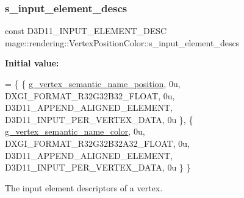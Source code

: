 \subsubsection{\texorpdfstring{s\+\_\+input\+\_\+element\+\_\+descs}{s\_input\_element\_descs}}
{\footnotesize\ttfamily const D3\+D11\+\_\+\+I\+N\+P\+U\+T\+\_\+\+E\+L\+E\+M\+E\+N\+T\+\_\+\+D\+E\+SC mage\+::rendering\+::\+Vertex\+Position\+Color\+::s\+\_\+input\+\_\+element\+\_\+descs\hspace{0.3cm}{\ttfamily [static]}}

{\bfseries Initial value\+:}
\begin{DoxyCode}
= \{
        \{ \hyperlink{namespacemage_1_1rendering_ae0a999915bd61d5a9d8addc04fe0646a}{g\_vertex\_semantic\_name\_position}, 0u, DXGI\_FORMAT\_R32G32B32\_FLOAT, 
         0u, D3D11\_APPEND\_ALIGNED\_ELEMENT, D3D11\_INPUT\_PER\_VERTEX\_DATA, 0u \},
        \{ \hyperlink{namespacemage_1_1rendering_a30c6185c03e23c5719a43ac9120d6f90}{g\_vertex\_semantic\_name\_color},    0u, DXGI\_FORMAT\_R32G32B32A32\_FLOAT, 
      0u, D3D11\_APPEND\_ALIGNED\_ELEMENT, D3D11\_INPUT\_PER\_VERTEX\_DATA, 0u \}
    \}
\end{DoxyCode}
The input element descriptors of a vertex. 